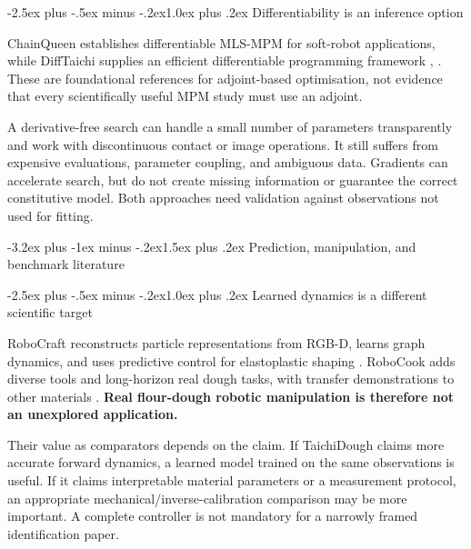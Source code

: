 \documentclass[
  11pt,
]{article}
\makeatletter
\renewcommand\section{\needspace{7\baselineskip}\@startsection{section}{1}{\z@}%
  {-3.2ex plus -1ex minus -.2ex}{1.5ex plus .2ex}%
  {\normalfont\sffamily\Large\bfseries\color{accent}}}
\renewcommand\subsection{\needspace{5\baselineskip}\@startsection{subsection}{2}{\z@}%
  {-2.5ex plus -.5ex minus -.2ex}{1.0ex plus .2ex}%
  {\normalfont\sffamily\large\bfseries\color{accent}}}
\makeatother
\begin{document}
\subsection{Differentiability is an inference
option}\label{differentiability-is-an-inference-option}

ChainQueen establishes differentiable MLS-MPM for soft-robot
applications, while DiffTaichi supplies an efficient differentiable
programming framework ,
. These are foundational
references for adjoint-based optimisation, not evidence that every
scientifically useful MPM study must use an adjoint.

A derivative-free search can handle a small number of parameters
transparently and work with discontinuous contact or image operations.
It still suffers from expensive evaluations, parameter coupling, and
ambiguous data. Gradients can accelerate search, but do not create
missing information or guarantee the correct constitutive model. Both
approaches need validation against observations not used for fitting.

\section{Prediction, manipulation, and benchmark
literature}\label{prediction-manipulation-and-benchmark-literature}

\subsection{Learned dynamics is a different scientific
target}\label{learned-dynamics-is-a-different-scientific-target}

RoboCraft reconstructs particle representations from RGB-D, learns graph
dynamics, and uses predictive control for elastoplastic shaping
. RoboCook adds diverse tools and
long-horizon real dough tasks, with transfer demonstrations to other
materials . \textbf{Real
flour-dough robotic manipulation is therefore not an unexplored
application.}

Their value as comparators depends on the claim. If TaichiDough claims
more accurate forward dynamics, a learned model trained on the same
observations is useful. If it claims interpretable material parameters
or a measurement protocol, an appropriate mechanical/inverse-calibration
comparison may be more important. A complete controller is not mandatory
for a narrowly framed identification paper.
\end{document}
